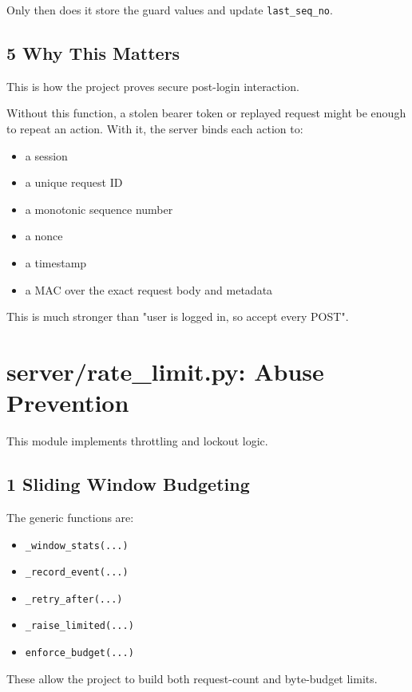 \documentclass[11pt,a4paper]{article}
\begin{document}
Only then does it store the guard values and update \nolinkurl{last_seq_no}.

\subsection{5 Why This Matters}

This is how the project proves secure post-login interaction.

Without this function, a stolen bearer token or replayed request might be enough to repeat an action. With it, the server binds each action to:

\begin{itemize}
\item a session
\item a unique request ID
\item a monotonic sequence number
\item a nonce
\item a timestamp
\item a MAC over the exact request body and metadata
\end{itemize}

This is much stronger than "user is logged in, so accept every POST".


\section{server/rate\_limit.py: Abuse Prevention}

This module implements throttling and lockout logic.

\subsection{1 Sliding Window Budgeting}

The generic functions are:

\begin{itemize}
\item \nolinkurl{_window_stats(...)}
\item \nolinkurl{_record_event(...)}
\item \nolinkurl{_retry_after(...)}
\item \nolinkurl{_raise_limited(...)}
\item \nolinkurl{enforce_budget(...)}
\end{itemize}

These allow the project to build both request-count and byte-budget limits.
\end{document}
